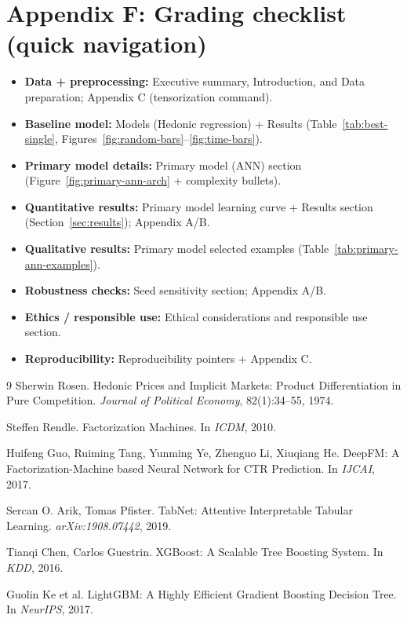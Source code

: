\documentclass[11pt]{article}
\begin{document}
\section{Appendix F: Grading checklist (quick navigation)}
\begin{itemize}[leftmargin=*]
  \item \textbf{Data + preprocessing:} Executive summary, Introduction, and Data preparation; Appendix C (tensorization command).
  \item \textbf{Baseline model:} Models (Hedonic regression) + Results (Table~\ref{tab:best-single}, Figures~\ref{fig:random-bars}--\ref{fig:time-bars}).
  \item \textbf{Primary model details:} Primary model (ANN) section (Figure~\ref{fig:primary-ann-arch} + complexity bullets).
  \item \textbf{Quantitative results:} Primary model learning curve + Results section (Section~\ref{sec:results}); Appendix A/B.
  \item \textbf{Qualitative results:} Primary model selected examples (Table~\ref{tab:primary-ann-examples}).
  \item \textbf{Robustness checks:} Seed sensitivity section; Appendix A/B.
  \item \textbf{Ethics / responsible use:} Ethical considerations and responsible use section.
  \item \textbf{Reproducibility:} Reproducibility pointers + Appendix C.
\end{itemize}

\begin{thebibliography}{9}
Sherwin Rosen.
\newblock Hedonic Prices and Implicit Markets: Product Differentiation in Pure Competition.
\newblock \emph{Journal of Political Economy}, 82(1):34--55, 1974.

Steffen Rendle.
\newblock Factorization Machines.
\newblock In \emph{ICDM}, 2010.

Huifeng Guo, Ruiming Tang, Yunming Ye, Zhenguo Li, Xiuqiang He.
\newblock DeepFM: A Factorization-Machine based Neural Network for CTR Prediction.
\newblock In \emph{IJCAI}, 2017.

Sercan O. Arik, Tomas Pfister.
\newblock TabNet: Attentive Interpretable Tabular Learning.
\newblock \emph{arXiv:1908.07442}, 2019.

Tianqi Chen, Carlos Guestrin.
\newblock XGBoost: A Scalable Tree Boosting System.
\newblock In \emph{KDD}, 2016.

Guolin Ke et al.
\newblock LightGBM: A Highly Efficient Gradient Boosting Decision Tree.
\newblock In \emph{NeurIPS}, 2017.
\end{thebibliography}
\end{document}
